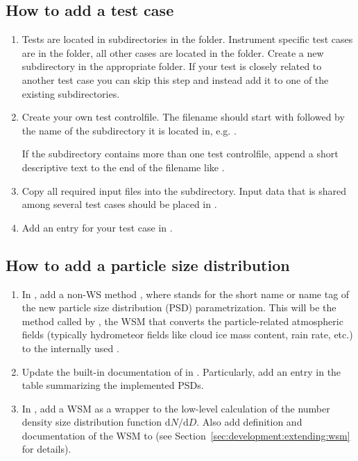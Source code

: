 \subsection{How to add a test case}
\begin{enumerate}
\item Tests are located in subdirectories in the 
  folder. Instrument specific test cases are in the
   folder, all other cases are
  located in the  folder. Create
  a new subdirectory in the appropriate folder. If your test is closely
  related to another test case you can skip this step and instead add it
  to one of the existing subdirectories.
\item Create your own test controlfile. The filename should start
  with  followed by the name
  of the subdirectory it is located in, e.g.
  .

  If the subdirectory contains more than one test controlfile,
  append a short descriptive text to the end of the filename like
  .
\item Copy all required input files into the subdirectory. Input data that is
  shared among several test cases should be placed in
  .
\item Add an entry for your test case in
  .
\end{enumerate}


\subsection{How to add a particle size distribution}
\begin{enumerate}
\item In , add a non-WS method
  , where  stands for the short
  name or name tag of the new particle size distribution (PSD) parametrization.
  This will be the method called by
  , the WSM that converts the
  particle-related atmospheric fields (typically hydrometeor fields like cloud ice
  mass content, rain rate, etc.) to the internally used .
\item Update the built-in documentation of
   in .
  Particularly, add an entry in the table summarizing the implemented PSDs.
\item In , add a WSM  as a
  wrapper to the low-level calculation of the number density size distribution
  function $\mathrm{d}N/\mathrm{d}D$. Also add definition and documentation of
  the WSM to  (see
  Section~\ref{sec:development:extending:wsm} for details).
\end{enumerate}

